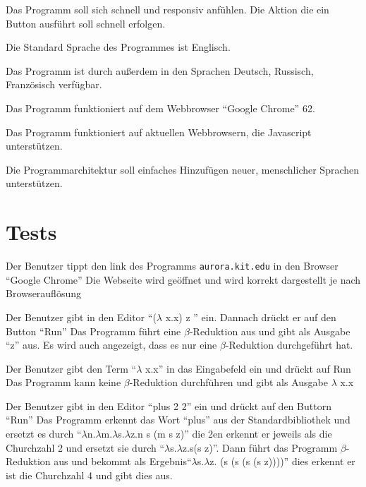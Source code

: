 \documentclass[parskip=full,11pt,twoside]{scrartcl}
\begin{document}
Das Programm soll sich schnell und responsiv anfühlen. Die Aktion die ein Button ausführt soll schnell erfolgen. 


Die Standard Sprache des Programmes ist Englisch.

Das Programm ist durch außerdem in den Sprachen Deutsch, Russisch, Französisch verfügbar.


Das Programm funktioniert auf dem Webbrowser \enquote{Google Chrome} 62.

Das Programm funktioniert auf aktuellen Webbrowsern, die Javascript unterstützen.

Die Programmarchitektur soll einfaches Hinzufügen neuer, menschlicher Sprachen unterstützen.


\section{Tests}


{Der Benutzer tippt den link des Programms \texttt{aurora.kit.edu} in den Browser \enquote {Google Chrome} }
{ Die Webseite wird geöffnet und wird korrekt dargestellt je nach Browserauflösung}

{ Der Benutzer gibt in den Editor \enquote {($\lambda$ x.x) z } ein. Dannach drückt er auf den Button \enquote {Run}}
{ Das Programm führt eine $\beta$-Reduktion aus und gibt als Ausgabe \enquote {z} aus. Es wird auch angezeigt, dass es nur eine $\beta$-Reduktion durchgeführt hat.}

{Der Benutzer gibt den Term \enquote {$\lambda$ x.x} in das Eingabefeld ein und drückt auf Run}
{Das Programm kann keine $\beta$-Reduktion durchführen und gibt als Ausgabe $\lambda$ x.x}

{Der Benutzer gibt in den Editor \enquote {plus 2 2} ein und drückt auf den Buttorn \enquote {Run}}
{ Das Programm erkennt das Wort \enquote {plus} aus der Standardbibliothek und ersetzt es durch \enquote {$\lambda$n.$\lambda$m.$\lambda$s.$\lambda$z.n s (m s z)} die 2en erkennt er jeweils als die Churchzahl 2 und ersetzt sie durch \enquote {$\lambda$s.$\lambda$z.s(s z)}. Dann führt das Programm $\beta$-Reduktion aus und bekommt als Ergebnis\enquote {$\lambda$s.$\lambda$z. (s (s (s (s z))))} dies erkennt er ist die Churchzahl 4 und gibt dies aus. }
\end{document}
